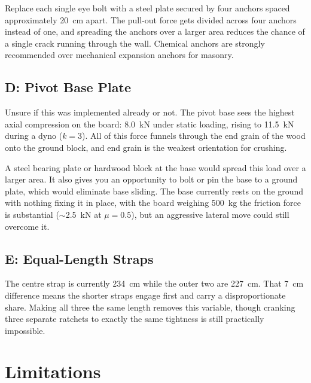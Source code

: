 \documentclass[12pt]{article}
\begin{document}
Replace each single eye bolt with a steel plate secured by four anchors spaced approximately 20~cm apart. The pull-out force gets divided across four anchors instead of one, and spreading the anchors over a larger area reduces the chance of a single crack running through the wall. Chemical anchors are strongly recommended over mechanical expansion anchors for masonry.

\subsection{D: Pivot Base Plate}
\label{sec:base_plate}

Unsure if this was implemented already or not. The pivot base sees the highest axial compression on the board: 8.0~kN under static loading, rising to 11.5~kN during a dyno ($k=3$). All of this force funnels through the end grain of the wood onto the ground block, and end grain is the weakest orientation for crushing.

A steel bearing plate or hardwood block at the base would spread this load over a larger area. It also gives you an opportunity to bolt or pin the base to a ground plate, which would eliminate base sliding. The base currently rests on the ground with nothing fixing it in place, with the board weighing 500~kg the friction force is substantial ($\sim$2.5~kN at $\mu = 0.5$), but an aggressive lateral move could still overcome it.

\subsection{E: Equal-Length Straps}
\label{sec:equal_straps}

The centre strap is currently 234~cm while the outer two are 227~cm. That 7~cm difference means the shorter straps engage first and carry a disproportionate share. Making all three the same length removes this variable, though cranking three separate ratchets to exactly the same tightness is still practically impossible.

\vspace{0.5em}

\section{Limitations}
\label{sec:limitations}
\end{document}

